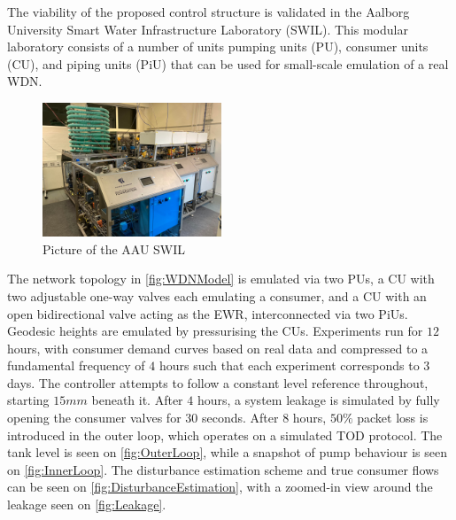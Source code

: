 The viability of the proposed control structure is validated in the Aalborg University Smart Water Infrastructure Laboratory (SWIL). This modular laboratory consists of a number of units pumping units (PU), consumer units (CU), and piping units (PiU) that can be used for small-scale emulation of a real WDN.

\begin{figure}[h!]
	\includegraphics[height=4cm, width=\linewidth]{Graphics/SWIL.pdf}
	\caption{Picture of the AAU SWIL}
	\label{fig:AAUSWIL}
\end{figure}

The network topology in \cref{fig:WDNModel} is emulated via two PUs, a CU with two adjustable one-way valves each emulating a consumer, and a CU with an open bidirectional valve acting as the EWR, interconnected via two PiUs. Geodesic heights are emulated by pressurising the CUs. Experiments run for $12$ hours, with consumer demand curves based on real data and compressed to a fundamental frequency of $4$ hours such that each experiment corresponds to $3$ days. The controller attempts to follow a constant level reference throughout, starting $15 \si{mm}$ beneath it. After $4$ hours, a system leakage is simulated by fully opening the consumer valves for $30$ seconds. After $8$ hours, $50\%$ packet loss is introduced in the outer loop, which operates on a simulated TOD protocol. The tank level is seen on \cref{fig:OuterLoop}, while a snapshot of pump behaviour is seen on \cref{fig:InnerLoop}. The disturbance estimation scheme and true consumer flows can be seen on \cref{fig:DisturbanceEstimation}, with a zoomed-in view around the leakage seen on \cref{fig:Leakage}.



